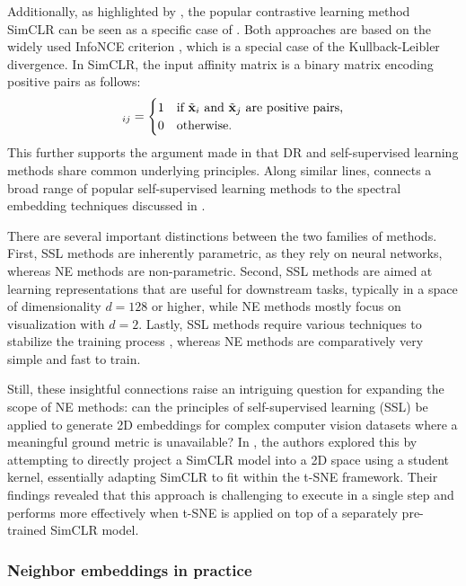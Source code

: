 Additionally, as highlighted by \citet{hu2022your}, the popular contrastive learning method SimCLR \citep{chen2020simple} can be seen as a specific case of . Both approaches are based on the widely used InfoNCE criterion \citep{oord2018representation}, which is a special case of the Kullback-Leibler divergence. In SimCLR, the input affinity matrix is a binary matrix encoding positive pairs as follows:
\begin{align}
[\tilde{\mP}]_{ij} = 
\begin{cases}
1 & \text{if } \tilde{\vx}_i \text{ and } \tilde{\vx}_j \text{ are positive pairs,} \\
0 & \text{otherwise.}
\end{cases}
\end{align}
This further supports the argument made in  that DR and self-supervised learning methods share common underlying principles. Along similar lines, \citet{balestriero2022contrastive} connects a broad range of popular self-supervised learning methods to the spectral embedding techniques discussed in .

There are several important distinctions between the two families of methods. First, SSL methods are inherently parametric, as they rely on neural networks, whereas NE methods are non-parametric. Second, SSL methods are aimed at learning representations that are useful for downstream tasks, typically in a space of dimensionality $d=128$ or higher, while NE methods mostly focus on visualization with $d=2$. Lastly, SSL methods require various techniques to stabilize the training process \citep{balestriero2023cookbookselfsupervisedlearning}, whereas NE methods are comparatively very simple and fast to train.

Still, these insightful connections raise an intriguing question for expanding the scope of NE methods: can the principles of self-supervised learning (SSL) be applied to generate 2D embeddings for complex computer vision datasets where a meaningful ground metric is unavailable? In \citep{bohm2022unsupervised}, the authors explored this by attempting to directly project a SimCLR model into a 2D space using a student kernel, essentially adapting SimCLR to fit within the t-SNE framework. Their findings revealed that this approach is challenging to execute in a single step and performs more effectively when t-SNE is applied on top of a separately pre-trained SimCLR model.

\subsubsection{Neighbor embeddings in practice}

